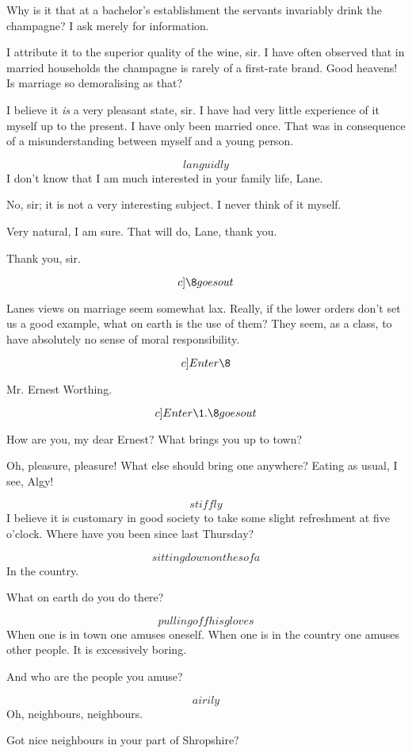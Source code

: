 \documentclass{book}
\begin{document}
\2  Why is it that at a bachelor's establishment the
servants invariably drink the champagne?  I ask merely for
information.

\8  I attribute it to the superior quality of the wine, sir.  I
have often observed that in married households the champagne is
rarely of a first-rate brand.
\2  Good heavens!  Is marriage so demoralising as that?

\8  I believe it \textit{is} a very pleasant state, sir.  I have had very
little experience of it myself up to the present.  I have only been
married once.  That was in consequence of a misunderstanding
between myself and a young person.

\2  \[languidly\]  I don't know that I am much interested in
your family life, Lane.

\8  No, sir; it is not a very interesting subject.  I never
think of it myself.

\2  Very natural, I am sure.  That will do, Lane, thank you.

\8  Thank you, sir. 

\[c]\8 goes out\]

\2  Lanes views on marriage seem somewhat lax.  Really, if
the lower orders don't set us a good example, what on earth is the
use of them?  They seem, as a class, to have absolutely no sense of
moral responsibility.

\[c]Enter \8\]

\8  Mr. Ernest Worthing.

\[c]Enter \1. \8 goes out\]

\2  How are you, my dear Ernest?  What brings you up to
town?

\1  Oh, pleasure, pleasure!  What else should bring one
anywhere?  Eating as usual, I see, Algy!

\2  \[stiffly\]  I believe it is customary in good society to
take some slight refreshment at five o'clock.  Where have you been
since last Thursday?

\1  \[sitting down on the sofa\]  In the country.

\2  What on earth do you do there?

\1 \[pulling off his gloves\] When one is in town one amuses oneself.
When one is in the country one amuses other people. It is excessively
boring.

\2  And who are the people you amuse?

\1  \[airily\]  Oh, neighbours, neighbours.

\2  Got nice neighbours in your part of Shropshire?
\end{document}
